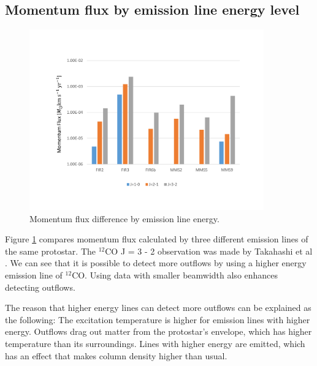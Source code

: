 \newpage

\subsection{Momentum flux by emission line energy level}

\begin{figure}[b!]
	\centering
	\includegraphics[width=0.9\textwidth]{outflow_J}
	\caption{Momentum flux difference by emission line energy.}
	\label{fig:J}
\end{figure}

Figure \ref{fig:J} compares momentum flux calculated by three different emission lines of the same protostar. The $^{12}$CO J = 3 - 2 observation was made by Takahashi et al \cite{takahashi2008millimeter}. We can see that it is possible to detect more outflows by using a higher energy emission line of $^{12}$CO. Using data with smaller beamwidth also enhances detecting outflows.
 
The reason that higher energy lines can detect more outflows can be explained as the following: The excitation temperature is higher for emission lines with higher energy. Outflows drag out matter from the protostar's envelope, which has higher temperature than its surroundings. Lines with higher energy are emitted, which has an effect that makes column density higher than usual.